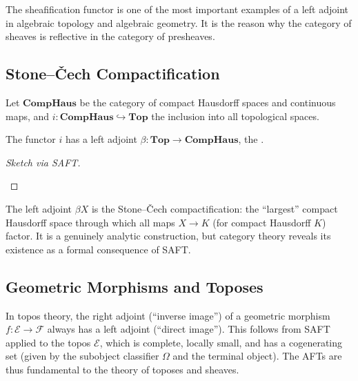 The sheafification functor is one of the most important examples of a
left adjoint in algebraic topology and algebraic geometry. It is the
reason why the category of sheaves is reflective in the category of
presheaves.

\subsection{Stone--\v{C}ech Compactification}

Let $\mathbf{CompHaus}$ be the category of compact Hausdorff spaces and
continuous maps, and $i: \mathbf{CompHaus} \hookrightarrow \mathbf{Top}$
the inclusion into all topological spaces.

\begin{theorem}
The functor $i$ has a left adjoint $\beta: \mathbf{Top} \to
\mathbf{CompHaus}$, the .
\end{theorem}

\begin{proof}[Sketch via SAFT]
\begin{prooflog}
\end{prooflog}
\end{proof}

The left adjoint $\beta X$ is the Stone--\v{C}ech compactification: the
``largest'' compact Hausdorff space through which all maps $X \to K$
(for compact Hausdorff $K$) factor. It is a genuinely analytic construction,
but category theory reveals its existence as a formal consequence of SAFT.

\subsection{Geometric Morphisms and Toposes}

In topos theory, the right adjoint (``inverse image'') of a geometric
morphism $f: \mathcal{E} \to \mathcal{F}$ always has a left adjoint
(``direct image''). This follows from SAFT applied to the topos $\mathcal{E}$,
which is complete, locally small, and has a cogenerating set (given by
the subobject classifier $\Omega$ and the terminal object). The AFTs are
thus fundamental to the theory of toposes and sheaves.


